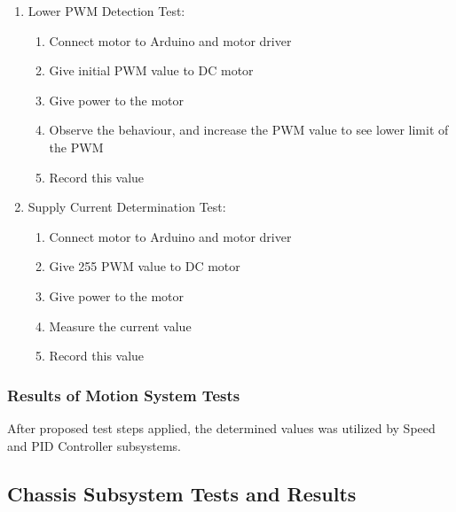 \documentclass[a4paper,12pt]{article}
\begin{document}
\begin{enumerate}

\item {Lower PWM Detection Test:} 

\begin{enumerate}
	 \item Connect motor to Arduino and motor driver 
	 \item Give initial PWM value to DC motor
	 \item Give power to the motor
	 \item Observe the behaviour, and increase the PWM value to see lower limit of the PWM
	 \item Record this value 
\end{enumerate}

\item {Supply Current Determination Test:} 

\begin{enumerate}
	\item Connect motor to Arduino and motor driver 
	\item Give 255 PWM value to DC motor
	\item Give power to the motor
	\item Measure the current value
	\item Record this value 
\end{enumerate}


\end{enumerate}




\subsubsection*{Results of Motion System Tests}

	After proposed test steps applied, the determined values was utilized by Speed and PID Controller subsystems. 







\subsection {Chassis Subsystem Tests and Results}
\end{document}
